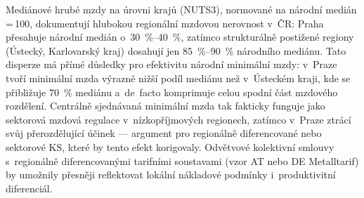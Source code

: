 Mediánové hrubé mzdy na úrovni krajů (NUTS3), normované na národní medián\,=\,100, dokumentují hlubokou regionální mzdovou nerovnost v~ČR: Praha přesahuje národní medián o~\SIrange{30}{40}{\percent}, zatímco strukturálně postižené regiony (Ústecký, Karlovarský kraj) dosahují jen \SIrange{85}{90}{\percent} národního mediánu.
Tato disperze má přímé důsledky pro efektivitu národní minimální mzdy: v~Praze tvoří minimální mzda výrazně nižší podíl mediánu než v~Ústeckém kraji, kde se přibližuje \SI{70}{\percent} mediánu a~de~facto komprimuje celou spodní část mzdového rozdělení.
Centrálně sjednávaná minimální mzda tak fakticky funguje jako sektorová mzdová regulace v~nízkopříjmových regionech, zatímco v~Praze ztrácí svůj přerozdělující účinek --- argument pro regionálně diferencované nebo sektorové \ac{KS}, které by tento efekt korigovaly.
Odvětvové kolektivní smlouvy s~regionálně diferencovanými tarifními soustavami (vzor AT nebo DE Metalltarif) by umožnily přesněji reflektovat lokální nákladové podmínky i~produktivitní diferenciál.


